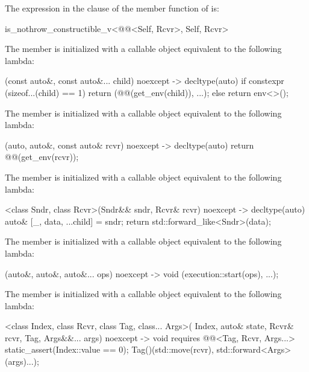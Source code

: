 \pnum
The expression in the  clause of
the  member function of  is:
\begin{codeblock}
is_nothrow_constructible_v<@@<Self, Rcvr>, Self, Rcvr>
\end{codeblock}

\pnum
The member 
is initialized with a callable object equivalent to the following lambda:
\begin{codeblock}
[](const auto&, const auto&... child) noexcept -> decltype(auto) {
  if constexpr (sizeof...(child) == 1)
    return (@@(get_env(child)), ...);
  else
    return env<>();
}
\end{codeblock}

\pnum
The member 
is initialized with a callable object equivalent to the following lambda:
\begin{codeblock}
[](auto, auto&, const auto& rcvr) noexcept -> decltype(auto) {
  return @@(get_env(rcvr));
}
\end{codeblock}

\pnum
The member 
is initialized with a callable object equivalent to the following lambda:
\begin{codeblock}
[]<class Sndr, class Rcvr>(Sndr&& sndr, Rcvr& rcvr) noexcept -> decltype(auto) {
  auto& [_, data, ...child] = sndr;
  return std::forward_like<Sndr>(data);
}
\end{codeblock}

\pnum
The member 
is initialized with a callable object equivalent to the following lambda:
\begin{codeblock}
[](auto&, auto&, auto&... ops) noexcept -> void {
  (execution::start(ops), ...);
}
\end{codeblock}

\pnum
The member 
is initialized with a callable object equivalent to the following lambda:
\begin{codeblock}
[]<class Index, class Rcvr, class Tag, class... Args>(
  Index, auto& state, Rcvr& rcvr, Tag, Args&&... args) noexcept
    -> void requires @@<Tag, Rcvr, Args...> {
  static_assert(Index::value == 0);
  Tag()(std::move(rcvr), std::forward<Args>(args)...);
}
\end{codeblock}

